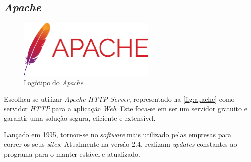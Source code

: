 \documentclass[11pt,twoside,a4paper]{report}
\begin{document}
\subsection{\textit{Apache}}
\begin{figure}[H]
	\begin{center}
		\includegraphics[width=0.6\textwidth]{apache} %
		\caption{Logótipo do \textit{Apache}}
		\label{fig:apache}
	\end{center}
\end{figure}
Escolheu-se utilizar \textit{Apache HTTP Server}, representado na \autoref{fig:apache} como servidor \textit{HTTP} para a aplicação \textit{Web}. Este foca-se em ser um servidor gratuito e garantir uma solução segura, eficiente e extensível\cite{apache}.\par
Lançado em 1995, tornou-se no \textit{software} mais utilizado pelas empresas para correr os seus \textit{sites}. Atualmente na versão 2.4, realizam \textit{updates} constantes ao programa para o manter estável e atualizado\cite{apache}.
\end{document}

